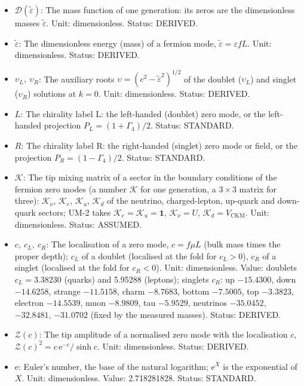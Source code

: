 \documentclass[
  10pt,
]{article}
\providecommand{\tightlist}{%
  \setlength{\itemsep}{0pt}\setlength{\parskip}{0pt}}
\begin{document}
\begin{itemize}
\tightlist
\item
  \(\mathcal{D}(\tilde\varepsilon)\): The mass function of one
  generation: its zeros are the dimensionless masses
  \(\tilde\varepsilon\). Unit: dimensionless. Status: DERIVED.
\item
  \(\tilde\varepsilon\): The dimensionless energy (mass) of a fermion
  mode, \(\tilde\varepsilon = \varepsilon fL\). Unit: dimensionless.
  Status: DERIVED.
\item
  \(\upsilon_L,\ \upsilon_R\): The auxiliary roots
  \(\upsilon = (c^2 - \tilde\varepsilon^2)^{1/2}\) of the doublet
  (\(\upsilon_L\)) and singlet (\(\upsilon_R\)) solutions at \(k = 0\).
  Unit: dimensionless. Status: DERIVED.
\item
  \(L\): The chirality label L: the left-handed (doublet) zero mode, or
  the left-handed projection \(P_L = (1 + \Gamma_4)/2\). Status:
  STANDARD.
\item
  \(R\): The chirality label R: the right-handed (singlet) zero mode or
  field, or the projection \(P_R = (1 - \Gamma_4)/2\). Status: STANDARD.
\item
  \(\mathcal{K}\): The tip mixing matrix of a sector in the boundary
  conditions of the fermion zero modes (a number \(\mathcal{K}\) for one
  generation, a \(3 \times 3\) matrix for three): \(\mathcal{K}_\nu\),
  \(\mathcal{K}_e\), \(\mathcal{K}_u\), \(\mathcal{K}_d\) of the
  neutrino, charged-lepton, up-quark and down-quark sectors; UM-2 takes
  \(\mathcal{K}_e = \mathcal{K}_u = \mathbf{1}\),
  \(\mathcal{K}_\nu = U\), \(\mathcal{K}_d = V_{\mathrm{CKM}}\). Unit:
  dimensionless. Status: ASSUMED.
\item
  \(c,\ c_L,\ c_R\): The localisation of a zero mode, \(c = f\mu L\)
  (bulk mass times the proper depth); \(c_L\) of a doublet (localised at
  the fold for \(c_L > 0\)), \(c_R\) of a singlet (localised at the fold
  for \(c_R < 0\)). Unit: dimensionless. Value: doublets
  \(c_L = 3.38230\) (quarks) and 5.95288 (leptons); singlets \(c_R\): up
  \(-15.4300\), down \(-14.6258\), strange \(-11.5158\), charm
  \(-8.7683\), bottom \(-7.5005\), top \(-3.3823\), electron
  \(-14.5539\), muon \(-8.9809\), tau \(-5.9529\), neutrinos
  \(-35.0452\), \(-32.8481\), \(-31.0702\) (fixed by the measured
  masses). Status: DERIVED.
\item
  \(\mathcal{Z}(c)\): The tip amplitude of a normalised zero mode with
  the localisation \(c\),
  \(\mathcal{Z}(c)^2 = c\,\mathrm{e}^{-c}/\sinh c\). Unit:
  dimensionless. Status: DERIVED.
\item
  \(\mathrm{e}\): Euler's number, the base of the natural logarithm;
  \(\mathrm{e}^{X}\) is the exponential of \(X\). Unit: dimensionless.
  Value: 2.718281828. Status: STANDARD.
\end{itemize}
\end{document}

